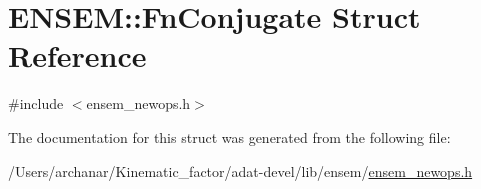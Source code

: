 \hypertarget{structENSEM_1_1FnConjugate}{}\section{E\+N\+S\+EM\+:\+:Fn\+Conjugate Struct Reference}
\label{structENSEM_1_1FnConjugate}


{\ttfamily \#include $<$ensem\+\_\+newops.\+h$>$}



The documentation for this struct was generated from the following file\+:\begin{DoxyCompactItemize}
\item 
/\+Users/archanar/\+Kinematic\+\_\+factor/adat-\/devel/lib/ensem/\mbox{\hyperlink{adat-devel_2lib_2ensem_2ensem__newops_8h}{ensem\+\_\+newops.\+h}}\end{DoxyCompactItemize}
